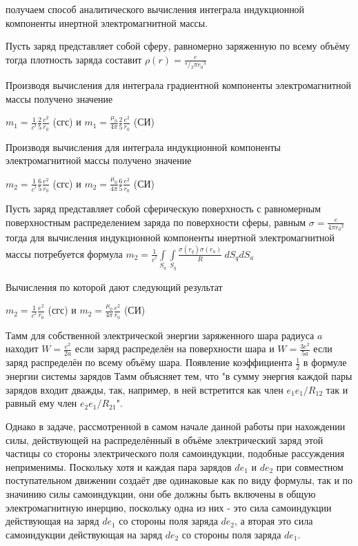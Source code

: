 \documentclass[11pt]{article}
\begin{document}
получаем способ аналитического вычисления интеграла индукционной
компоненты инертной электромагнитной массы.

    Пусть заряд представляет собой сферу, равномерно заряженную по всему
объёму тогда плотность заряда составит
\(\rho \left( r \right)=\frac{e}{{}^{4}/{}_{3}\pi {{r}_{0}}^{3}}\)

Производя вычисления для интеграла градиентной компоненты
электромагнитной массы получено значение

\(m_1 =\frac{1}{{{c}^{^{2}}}}\frac{2}{5}\frac{e^2}{{{r}_{0}}}\) (сгс) и
\(m_1 =\frac{{{\mu }_{0}}}{4\pi }\frac{2}{5}\frac{e^2}{{{r}_{0}}}\) (СИ)

Производя вычисления для интеграла индукционной компоненты
электромагнитной массы получено значение

\(m_2 =\frac{1}{{{c}^{^{2}}}}\frac{6}{5}\frac{e^2}{{{r}_{0}}}\) (сгс) и
\(m_2 =\frac{{{\mu }_{0}}}{4\pi }\frac{6}{5}\frac{e^2}{{{r}_{0}}}\) (СИ)

    Пусть заряд представляет собой сферическую поверхность с равномерным
поверхностным распределением заряда по поверхности сферы, равным
\(\sigma=\frac{e}{4\pi {{r}_{0}}^{2}}\) тогда для вычисления
индукционной компоненты инертной электромагнитной массы потребуется
формула
\(m_2=\frac{1}{{{c}^{^{2}}}}\int\limits_{{{S}_{a}}}{\int\limits_{{{S}_{q}}}{\frac{\sigma \left( {{r}_{q}} \right)\sigma \left( {{r}_{a}} \right)}{R}}}\ d{{S}_{q}}d{{S}_{a}}\)

Вычисления по которой дают следующий результат

\(m_2 =\frac{1}{{{c}^{^{2}}}}\frac{e^2}{{{r}_{0}}}\) (сгс) и
\(m_2 =\frac{{{\mu }_{0}}}{4\pi }\frac{e^2}{{{r}_{0}}}\) (СИ)

    Тамм \cite{tamm} для собственной электрической энергии заряженного шара
радиуса \(a\) находит \(W=\frac{e^2}{2a}\) если заряд распределён на
поверхности шара и \(W=\frac{3e^2}{5a}\) если заряд распределён по всему
объёму шара. Появление коэффициента \(\frac{1}{2}\) в формуле энергии
системы зарядов Тамм объясняет тем, что "в сумму энергия каждой пары
зарядов входит дважды, так, например, в ней встретится как член
\({e_{1}}{e_{1}}/{R_{12}}\) так и равный ему член
\({e_{2}}{e_{1}}/{R_{21}}\)".

Однако в задаче, рассмотренной в самом начале данной работы при
нахождении силы, действующей на распределённый в объёме электрический
заряд этой частицы со стороны электрического поля самоиндукции, подобные
рассуждения неприменимы. Поскольку хотя и каждая пара зарядов
\(d{e}_{1}\) и \(d{e}_{2}\) при совместном поступательном движении
создаёт две одинаковые как по виду формулы, так и по значинию силы
самоиндукции, они обе должны быть включены в общую электромагнитную
инерцию, поскольку одна из них - это сила самоиндукции действующая на
заряд \(d{e}_{1}\) со стороны поля заряда \(d{e}_{2}\), а вторая это
сила самоиндукции действующая на заряд \(d{e}_{2}\) со стороны поля
заряда \(d{e}_{1}\).
\end{document}
